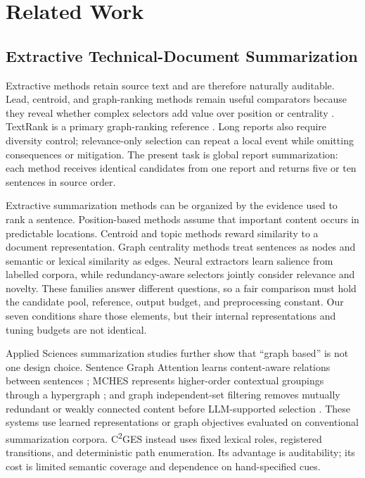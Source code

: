 \documentclass[applsci,article,submit,moreauthors]{Definitions/mdpi}
\newcommand{\cges}{C\textsuperscript{2}GES}
\begin{document}
\section{Related Work}

\subsection{Extractive Technical-Document Summarization}

Extractive methods retain source text and are therefore naturally auditable. Lead, centroid, and graph-ranking methods remain useful comparators because they reveal whether complex selectors add value over position or centrality \cite{zhong2020extractive,bi2021aredsum,liu2021unsupervised}. TextRank is a primary graph-ranking reference \cite{mihalcea2004textrank}. Long reports also require diversity control; relevance-only selection can repeat a local event while omitting consequences or mitigation. The present task is global report summarization: each method receives identical candidates from one report and returns five or ten sentences in source order.

Extractive summarization methods can be organized by the evidence used to rank a sentence. Position-based methods assume that important content occurs in predictable locations. Centroid and topic methods reward similarity to a document representation. Graph centrality methods treat sentences as nodes and semantic or lexical similarity as edges. Neural extractors learn salience from labelled corpora, while redundancy-aware selectors jointly consider relevance and novelty. These families answer different questions, so a fair comparison must hold the candidate pool, reference, output budget, and preprocessing constant. Our seven conditions share those elements, but their internal representations and tuning budgets are not identical.

Applied Sciences summarization studies further show that ``graph based'' is not one design choice. Sentence Graph Attention learns content-aware relations between sentences \cite{siragusa2022sentencegraph}; MCHES represents higher-order contextual groupings through a hypergraph \cite{onan2024mches}; and graph independent-set filtering removes mutually redundant or weakly connected content before LLM-supported selection \cite{hark2025mis}. These systems use learned representations or graph objectives evaluated on conventional summarization corpora. \cges{} instead uses fixed lexical roles, registered transitions, and deterministic path enumeration. Its advantage is auditability; its cost is limited semantic coverage and dependence on hand-specified cues.
\end{document}
